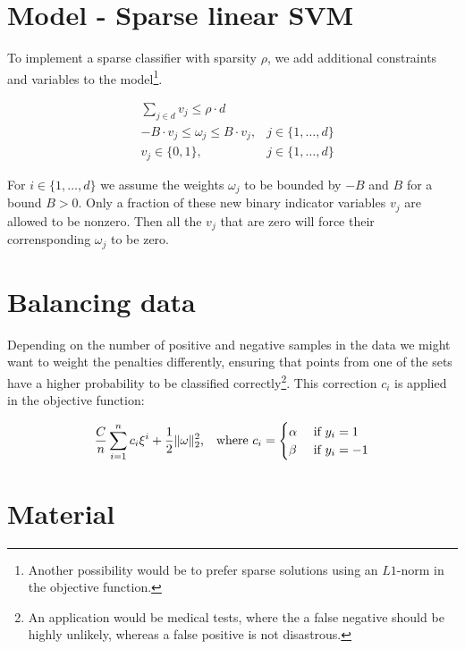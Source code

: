 \documentclass[11pt]{article}
\begin{document}
\section*{Model - Sparse linear SVM}

To implement a sparse classifier with sparsity $\rho$, we add additional constraints and variables to the model\footnote{
  Another possibility would be to prefer sparse solutions using an $L1$-norm in the objective function.}.

\begin{equation*}
\begin{array}{rll}
  & \sum_{j \in d} v_{j} \leq \rho \cdot d
  &
\\
  & -B \cdot v_{j} \leq \omega_{j} \leq B \cdot v_{j},
  & j \in \{ 1, \dots, d \}
\\
  & v_{j} \in \{0,1\},
  & j \in \{1,\dots, d\}
\end{array}
\end{equation*}

For $i \in \{ 1, \dots, d \}$ we assume the weights $\omega_j$ to be bounded by $-B$ and $B$ for a bound $B > 0$.
Only a fraction of these new binary indicator variables $v_j$ are allowed to be nonzero.
Then all the $v_j$ that are zero will force their corrensponding $\omega_j$ to be zero.

\section*{Balancing data}

Depending on the number of positive and negative samples in the data we might want to weight the penalties differently, ensuring that points from one of the sets have a higher probability to be classified correctly\footnote{
  An application would be medical tests, where the a false negative should be highly unlikely, whereas a false positive is not disastrous.}.
This correction $c_i$ is applied in the objective function:

$$
\frac{C}{n} \sum\limits_{i = 1}^n c_i \xi^i + \frac{1}{2} \lVert \omega \rVert_2^2
\text{,\quad where } c_i =
\begin{cases}
  \alpha & \text{ if } y_i = 1 \\
  \beta & \text{ if } y_i = -1
\end{cases}
$$

\section*{Material}
\end{document}
